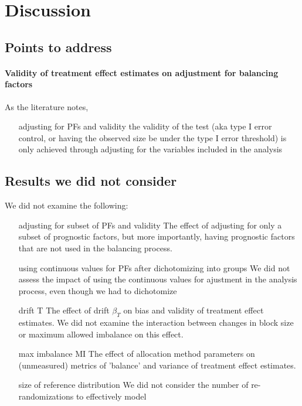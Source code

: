 \section{Discussion}

\subsection{Points to address}
\paragraph{Validity of treatment effect estimates on adjustment for balancing factors}
As the literature notes, %

\begin{itemize}
	\item[adjusting for PFs and validity] the validity of the test (aka type I error control, or having the observed size be under the type I error threshold) is only achieved through adjusting for the variables included in the analysis
\end{itemize}

\subsection{Results we did not consider}
We did not examine the following:
\begin{itemize}
	\item[ adjusting for subset of PFs and validity ] The effect of adjusting for only a subset of prognostic factors, but more importantly, having prognostic factors that are not used in the balancing process.
	\item[ using continuous values for PFs after dichotomizing into groups ] We did not assess the impact of using the continuous values for ajustment in the analysis process, even though we had to dichotomize
	\item[ drift T ] The effect of drift $\beta_{T}$ on bias and validity of treatment effect estimates. We did not examine the interaction between changes in block size or maximum allowed imbalance on this effect.
	\item[ max imbalance MI ] The effect of allocation method parameters on (unmeasured) metrics of 'balance' and variance of treatment effect estimates.
	\item[ size of reference distribution ] We did not consider the number of re-randomizations to effectively model 
\end{itemize}

